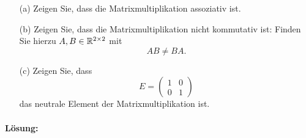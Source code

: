 \documentclass[
				a4paper,
				10pt
			]
			{scrartcl}
\begin{document}
\begin{itemize}
	\item[(a)] Zeigen Sie, dass die Matrixmultiplikation assoziativ ist.
	\item[(b)] Zeigen Sie, dass die Matrixmultiplikation nicht kommutativ ist: 
			Finden Sie hierzu $A,B \in \mathbb{R}^{2\times 2}$ mit
			$$
				AB \neq BA.
			$$
	\item[(c)] Zeigen Sie, dass  
			$$
				E
				=
				\begin{pmatrix}
					1	&	0\\
					0	&	1
				\end{pmatrix}
			$$ 
			das neutrale Element der Matrixmultiplikation ist. 
%			
\end{itemize}


\paragraph{L\"osung:}
\end{document}
